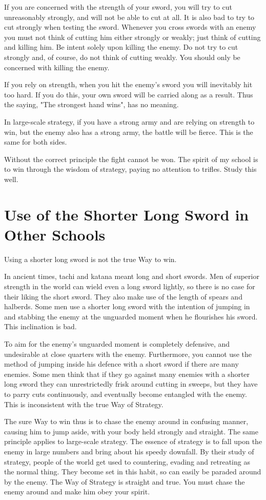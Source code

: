 \documentclass[12pt]{report}
\begin{document}
If you are concerned with the strength of your sword, you will try to cut unreasonably strongly, and will not be able to cut at all. It is also bad to try to cut strongly when testing the sword. Whenever you cross swords with an enemy you must not think of cutting him either strongly or weakly; just think of cutting and killing him. Be intent solely upon killing the enemy. Do not try to cut strongly and, of course, do not think of cutting weakly. You should only be concerned with killing the enemy.

If you rely on strength, when you hit the enemy's sword you will inevitably hit too hard. If you do this, your own sword will be carried along as a result. Thus the saying, "The strongest hand wins", has no meaning.

In large-scale strategy, if you have a strong army and are relying on strength to win, but the enemy also has a strong army, the battle will be fierce. This is the same for both sides.

Without the correct principle the fight cannot be won. The spirit of my school is to win through the wisdom of strategy, paying no attention to trifles. Study this well.
\section*{Use of the Shorter Long Sword in Other Schools}
Using a shorter long sword is not the true Way to win.

In ancient times, tachi and katana meant long and short swords. Men of superior strength in the world can wield even a long sword lightly, so there is no case for their liking the short sword. They also make use of the length of spears and halberds. Some men use a shorter long sword with the intention of jumping in and stabbing the enemy at the unguarded moment when he flourishes his sword. This inclination is bad.

To aim for the enemy's unguarded moment is completely defensive, and undesirable at close quarters with the enemy. Furthermore, you cannot use the method of jumping inside his defence with a short sword if there are many enemies. Some men think that if they go against many enemies with a shorter long sword they can unrestrictedly frisk around cutting in sweeps, but they have to parry cuts continuously, and eventually become entangled with the enemy. This is inconsistent with the true Way of Strategy.

The sure Way to win thus is to chase the enemy around in confusing manner, causing him to jump aside, with your body held strongly and straight. The same principle applies to large-scale strategy. The essence of strategy is to fall upon the enemy in large numbers and bring about his speedy downfall. By their study of strategy, people of the world get used to countering, evading and retreating as the normal thing. They become set in this habit, so can easily be paraded around by the enemy. The Way of Strategy is straight and true. You must chase the enemy around and make him obey your spirit.
\end{document}
